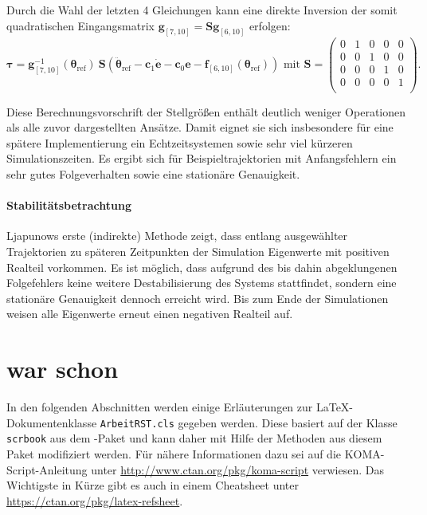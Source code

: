 Durch die Wahl der letzten 4 Gleichungen kann eine direkte Inversion der somit quadratischen Eingangsmatrix $\pmb{g}_{[7, 10]} = \pmb{S} \pmb{g}_{[6, 10]}$ erfolgen:
\begin{equation}
	\pmb{\tau}= \pmb{g}^{-1}_{[7, 10]}(\pmb{\theta}_{\text{ref}}) \ \pmb{S}(\ddot{\pmb{\theta}}_{\text{ref}} - \pmb{c}_{1} \pmb{\dot{e}} - \pmb{c}_{0} \pmb{e} - \pmb{f}_{[6, 10]}(\pmb{\theta}_{\text{ref}})) \text{ mit } 
	\pmb{S} = 
	\begin{pmatrix}
	0 & 1 & 0 & 0 & 0 \\
	0 & 0 & 1 & 0 & 0 \\
	0 & 0 & 0 & 1 & 0 \\
	0 & 0 & 0 & 0 & 1 \\
	\end{pmatrix}.
\end{equation}

Diese Berechnungsvorschrift der Stellgrößen enthält deutlich weniger Operationen als alle zuvor dargestellten Ansätze. Damit eignet sie sich insbesondere für eine spätere Implementierung ein Echtzeitsystemen sowie sehr viel kürzeren Simulationszeiten. Es ergibt sich für Beispieltrajektorien mit Anfangsfehlern ein sehr gutes Folgeverhalten sowie eine stationäre Genauigkeit.

\subsubsection{Stabilitätsbetrachtung}
Ljapunows erste (indirekte) Methode zeigt, dass entlang ausgewählter Trajektorien zu späteren Zeitpunkten der Simulation Eigenwerte mit positiven Realteil vorkommen. Es ist möglich, dass aufgrund des bis dahin abgeklungenen Folgefehlers keine weitere Destabilisierung des Systems stattfindet, sondern eine stationäre Genauigkeit dennoch erreicht wird. Bis zum Ende der Simulationen weisen alle Eigenwerte erneut einen negativen Realteil auf.

\chapter{war schon}
In den folgenden Abschnitten werden einige Erläuterungen zur \LaTeX-Dokumentenklasse \texttt{ArbeitRST.cls} gegeben werden. Diese basiert auf der Klasse \texttt{scrbook} aus dem \KOMAScript-Paket und kann daher mit Hilfe der Methoden aus diesem Paket modifiziert werden. Für nähere Informationen dazu sei auf die KOMA-Script-Anleitung unter \url{http://www.ctan.org/pkg/koma-script} verwiesen. Das Wichtigste in Kürze gibt es auch in einem Cheatsheet unter \url{https://ctan.org/pkg/latex-refsheet}.

